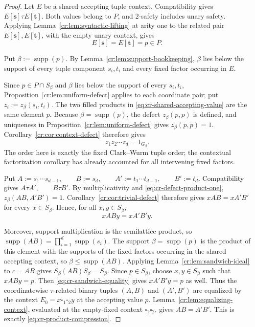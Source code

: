 \documentclass[10pt,a4paper]{article}
\theoremstyle{definition}
\theoremstyle{remark}
\newcommand{\blank}{\square}
\begin{document}
\begin{proof}
Let $E$ be a shared accepting tuple context. Compatibility gives \(E[\mathbf s]\tau E[\mathbf t].\) Both values belong to $P$, and $2$-safety includes unary safety.  Applying
Lemma~\ref{cr:lem:syntactic-lifting} at arity one to the related pair
\(E[\mathbf s],E[\mathbf t]\), with the empty unary context, gives
\begin{equation}
E[\mathbf s]
=
E[\mathbf t]
=
p\in P.
\label{eq:cr-shared-accepting-value}
\end{equation}

Put \(\beta:=\operatorname{supp}(p).\) By
Lemma~\ref{cr:lem:support-bookkeeping}, $\beta$ lies below the support of every
tuple component $s_i,t_i$ and every fixed factor occurring in $E$.

Since $p\in P\cap S_\beta$ and $\beta$ lies below the support of every
$s_i,t_i$, Proposition~\ref{cr:lem:uniform-defect} applies to each coordinate pair;
put \(z_i:=z_\beta(s_i,t_i).\)  The two filled products in
\eqref{eq:cr-shared-accepting-value} are the same element $p$.  Because
$\beta=\operatorname{supp}(p)$, the defect $z_\beta(p,p)$ is defined, and
uniqueness in Proposition~\ref{cr:lem:uniform-defect} gives
$z_\beta(p,p)=1$.  Corollary~\ref{cr:cor:context-defect} therefore gives
\begin{equation}
z_1z_2\cdots z_d
=
1_{G_\beta}.
\label{eq:cr-defect-product-one}
\end{equation}
The order here is exactly the fixed Clark--Wurm tuple order; the contextual
factorization corollary has already accounted for all intervening fixed
factors.

Put
\(A:=s_1\cdots s_{d-1}, \qquad B:=s_d, \qquad A':=t_1\cdots t_{d-1}, \qquad B':=t_d.\)
Compatibility gives
\(A\tau A', \qquad B\tau B'.\)
By multiplicativity and \eqref{eq:cr-defect-product-one},
\(z_\beta(AB,A'B')=1.\)
Corollary~\ref{cr:cor:trivial-defect} therefore gives
\(xAB=xA'B'\) for every $x\in S_\beta$.  Hence, for all
$x,y\in S_\beta$,
\begin{equation}
xABy=xA'B'y.
\label{eq:cr-sandwich-equality}
\end{equation}

Moreover, support multiplication is the semilattice product, so
\(\operatorname{supp}(AB)=\prod_{i=1}^d\operatorname{supp}(s_i)\).
The support $\beta=\operatorname{supp}(p)$ is the product of this element
with the supports of the fixed factors occurring in the shared accepting context,
so \(\beta\le\operatorname{supp}(AB).\)
Applying Lemma~\ref{cr:lem:sandwich-ideal} to \(c=AB\) gives
\(S_\beta(AB)S_\beta=S_\beta.\)
Since \(p\in S_\beta\), choose \(x,y\in S_\beta\) such that
\(xABy=p.\)
Then \eqref{eq:cr-sandwich-equality} gives \(xA'B'y=p\) as well.  Thus the coordinatewise
$\tau$-related binary tuples $(A,B)$ and $(A',B')$ are equalized by the
context $E_0=x\blank_1\blank_2y$ at the accepting value $p$.
Lemma~\ref{cr:lem:equalizing-context}, evaluated at the empty-fixed context
$\blank_1\blank_2$, gives \(AB=A'B'.\)  This is exactly \eqref{eq:cr-product-compression}.
\end{proof}
\end{document}

